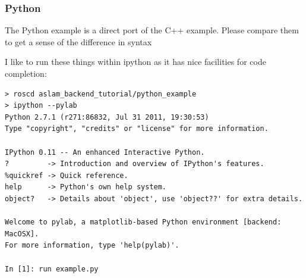 \documentclass[11pt,a4,oneside]{article}
\newcommand{\listpython}[2]{}
\begin{document}
\subsubsection{Python}
The Python example is a direct port of the C++ example. Please compare them to get a sense of the difference in syntax
\listpython{python\_example/example.py}{../../aslam_backend_tutorial/python_example/example.py}
I like to run these things within ipython as it has nice facilities for code completion:
\begin{lstlisting}
> roscd aslam_backend_tutorial/python_example
> ipython --pylab
Python 2.7.1 (r271:86832, Jul 31 2011, 19:30:53) 
Type "copyright", "credits" or "license" for more information.

IPython 0.11 -- An enhanced Interactive Python.
?         -> Introduction and overview of IPython's features.
%quickref -> Quick reference.
help      -> Python's own help system.
object?   -> Details about 'object', use 'object??' for extra details.

Welcome to pylab, a matplotlib-based Python environment [backend: MacOSX].
For more information, type 'help(pylab)'.

In [1]: run example.py
\end{lstlisting}


\end{document}
